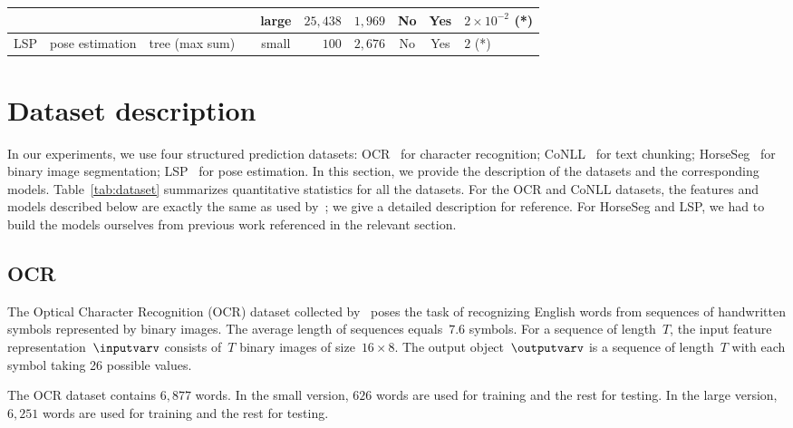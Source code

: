 \documentclass{article}
\begin{document}
\begin{table*}[t]
{\begin{tabular}{@{}lllccrrccl@{}}
            \\
            &                   &                   &                   & large                & $25,438$ & $1,969$                        & No       & Yes             & $2 \times 10^{-2}$ (*)
            \\ \midrule
            LSP                       & pose estimation          & \multirow{1}{*}{tree (max sum)}            &   \parbox{\citationLengthTable}{\centering \citep{Johnson10}}                & small                & $100$   & $2,676$                        & No       & Yes             &  $2$ (*) \\ %
            \bottomrule
        \end{tabular}
    }
\end{table*}


\section{Dataset description \label{app:dataset_table}}
In our experiments, we use four structured prediction datasets: OCR~\cite{Taskar2003} for character recognition; CoNLL~\cite{Sang2000} for text chunking; HorseSeg~\cite{kolesnikov2014closed} for binary image segmentation; LSP~\cite{Johnson10} for pose estimation.
In this section, we provide the description of the datasets and the corresponding models.
Table~\ref{tab:dataset} summarizes quantitative statistics for all the datasets.
For the OCR and CoNLL datasets, the features and models described below are exactly the same as used by~\citet{lacosteJulien13bcfw}; we give a detailed description for reference. For HorseSeg and LSP, we had to build the models ourselves from previous work referenced in the relevant section.


\subsection{OCR}
The Optical Character Recognition (OCR) dataset collected by~\citet{Taskar2003} poses the task of recognizing English words from sequences of handwritten symbols represented by binary images.
The average length of sequences equals~$7.6$ symbols.
For a sequence of length~$T$,  the input feature representation~$\inputvarv$ consists of~$T$ binary images of size~$16 \times 8$.
The output object~$\outputvarv$ is a sequence of length~$T$ with each symbol taking 26 possible values.

The OCR dataset contains $6,877$ words.
In the small version, $626$ words are used for training and the rest for testing.
In the large version, $6,251$ words are used for training and the rest for testing.
\end{document}
